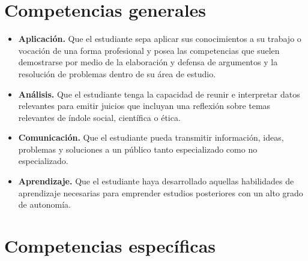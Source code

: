 \documentclass[11pt]{articulo}
\begin{document}
\section{Competencias generales}

\begin{itemize}

\item{{\bf Aplicaci\'on.} Que el estudiante sepa aplicar sus conocimientos a su trabajo o vocaci\'on de una forma profesional y posea las competencias que suelen demostrarse por medio de la elaboraci\'on y defensa de argumentos y la resoluci\'on de problemas dentro de su \'area de estudio.}

\item{{\bf An\'alisis.} Que el estudiante tenga la capacidad de reunir e interpretar datos relevantes para emitir juicios que incluyan una reflexi\'on sobre temas relevantes de \'indole social, cient\'ifica o \'etica.}

\item{{\bf Comunicaci\'on.} Que el estudiante pueda transmitir informaci\'on, ideas, problemas y soluciones a un p\'ublico tanto especializado como no especializado.}

\item{{\bf Aprendizaje.} Que el estudiante haya desarrollado aquellas habilidades de aprendizaje necesarias para emprender estudios posteriores con un alto grado de autonom\'ia.}

\end{itemize}

\section{Competencias espec\'ificas}
\end{document}
